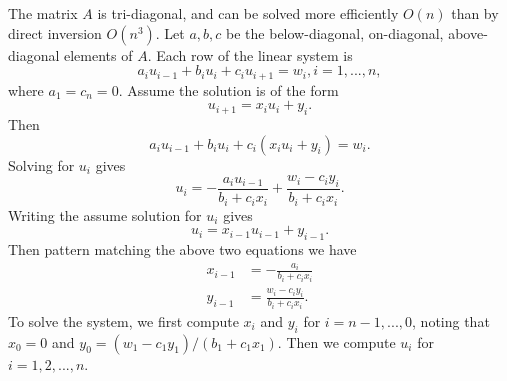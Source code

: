 \documentclass{article}
\begin{document}
The matrix $A$ is tri-diagonal, and can be solved more efficiently $O(n)$ than by direct inversion $O(n^3)$.  Let $a, b, c$ be the below-diagonal, on-diagonal, above-diagonal elements of $A$.  Each row of the linear system is
\begin{equation}
  a_i u_{i-1} + b_i u_i + c_i u_{i+1} = w_i, i=1,...,n,
\end{equation}
where $a_1=c_n=0$.  Assume the solution is of the form
\begin{equation}
  u_{i+1} = x_i u_i + y_i.
\end{equation}
Then
\begin{equation}
  a_i u_{i-1} + b_i u_i + c_i (x_i u_i + y_i) = w_i.
\end{equation}
Solving for $u_i$ gives
\begin{equation}
  u_i = -\frac{a_i u_{i-1}}{b_i + c_i x_i} + \frac{w_i - c_i y_i}{b_i + c_i x_i}.
\end{equation}
Writing the assume solution for $u_i$ gives
\begin{equation}
  u_i = x_{i-1} u_{i-1} + y_{i-1}.
\end{equation}
Then pattern matching the above two equations we have
\begin{align}
  x_{i-1} & = -\frac{a_i}{b_i + c_i x_i} \\
  y_{i-1} & = \frac{w_i - c_i y_i}{b_i + c_i x_i}.
\end{align}
To solve the system, we first compute $x_i$ and $y_i$ for $i=n-1,...,0$, noting that $x_0=0$ and $y_0=(w_1-c_1y_1)/(b_1+c_1x_1)$.  Then we compute $u_i$ for $i=1,2,...,n$.



\end{document}

